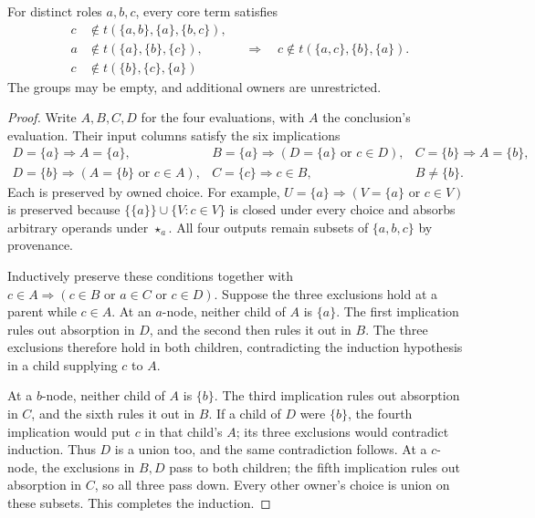 \begin{proposition}\label{core:prop:four-persistence}
For distinct roles $a,b,c$, every core term satisfies
\[
\begin{split}
 c&\notin t(\{a,b\},\{a\},\{b,c\}),\\
 a&\notin t(\{a\},\{b\},\{c\}),\\
 c&\notin t(\{b\},\{c\},\{a\})
\end{split}
\quad\Longrightarrow\quad
c\notin t(\{a,c\},\{b\},\{a\}).
\]
The groups may be empty, and additional owners are unrestricted.
\end{proposition}
\begin{proof}
Write $A,B,C,D$ for the four evaluations, with $A$ the conclusion's
evaluation. Their input columns satisfy the six implications
\[
\begin{array}{lll}
 D=\{a\}\Rightarrow A=\{a\},&
 B=\{a\}\Rightarrow(D=\{a\}\text{ or }c\in D),&
 C=\{b\}\Rightarrow A=\{b\},\\
 D=\{b\}\Rightarrow(A=\{b\}\text{ or }c\in A),&
 C=\{c\}\Rightarrow c\in B,&B\ne\{b\}.
\end{array}
\]
Each is preserved by owned choice. For example,
$U=\{a\}\Rightarrow(V=\{a\}\text{ or }c\in V)$ is preserved because
$\{\{a\}\}\cup\{V:c\in V\}$ is closed under every choice and absorbs
arbitrary operands under $\star_a$. All four outputs remain subsets of
$\{a,b,c\}$ by provenance.

Inductively preserve these conditions together with
$c\in A\Rightarrow(c\in B\text{ or }a\in C\text{ or }c\in D)$.
Suppose the three exclusions hold at a parent while $c\in A$.
At an $a$-node, neither child of $A$ is $\{a\}$. The first implication
rules out absorption in $D$, and the second then rules it out in $B$.
The three exclusions therefore hold in both children, contradicting
the induction hypothesis in a child supplying $c$ to $A$.

At a $b$-node, neither child of $A$ is $\{b\}$. The third implication
rules out absorption in $C$, and the sixth rules it out in $B$.
If a child of $D$ were $\{b\}$, the fourth implication would put $c$
in that child's $A$; its three exclusions would contradict induction.
Thus $D$ is a union too, and the same contradiction follows.
At a $c$-node, the exclusions in $B,D$ pass to both children; the fifth
implication rules out absorption in $C$, so all three pass down.
Every other owner's choice is union on these subsets. This completes
the induction.
\end{proof}

